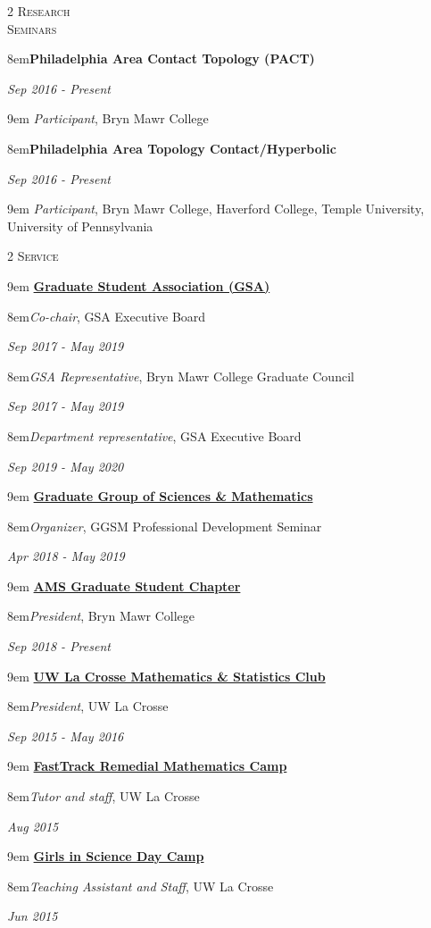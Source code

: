 \documentclass[11pt]{article}
\newcommand{\itemreg}[1]{\begin{addmargin}[0em]{9em} #1 \end{addmargin}}
\newcommand{\itemregind}[1]{\begin{addmargin}[1.75em]{9em} #1 \end{addmargin}}
\newcommand{\itemregdate}[2]{\begin{addmargin}[0em]{8em}#1\end{addmargin}\vspace{-1.5em}\hfill\textit{#2}\\ \vspace{.25em}}
\newcommand{\iteminddate}[2]{\begin{addmargin}[1.75em]{8em}#1\end{addmargin}\vspace{-1.5em}\hfill\textit{#2}\\ \vspace{.25em}}
\begin{document}
\begin{multicols}{2}
	\textsc{Research \\ Seminars}
	
	\columnbreak
	
	\itemregdate{\textbf{Philadelphia Area Contact Topology (PACT)}}{Sep 2016 - Present}
		\itemregind{\textit{Participant}, Bryn Mawr College}
	\itemregdate{\textbf{Philadelphia Area Topology Contact/Hyperbolic}}{Sep 2016 - Present}
		\itemregind{\textit{Participant}, Bryn Mawr College, Haverford College, Temple University, University of Pennsylvania}
	
\end{multicols}
\vspace{-.5em}



\begin{multicols}{2}
	\textsc{Service}
	
	\columnbreak
	
	\itemreg{\textbf{\href{https://www.brynmawr.edu/gsas/}{Graduate Student Association (GSA)}}}
		\iteminddate{\textit{Co-chair}, GSA Executive Board}{Sep 2017 - May 2019}
		\iteminddate{\textit{GSA Representative}, Bryn Mawr College Graduate Council}{Sep 2017 - May 2019}
		\iteminddate{\textit{Department representative}, GSA Executive Board}{Sep 2019 - May 2020}
		\vspace{.35em}
		
	\itemreg{\textbf{\href{https://www.brynmawr.edu/ggsm}{Graduate Group of Sciences \& Mathematics}}}
		\iteminddate{\textit{Organizer}, GGSM Professional Development Seminar}{Apr 2018 - May 2019}
		\vspace{.35em}
		
	\itemreg{\textbf{\href{http://www.ams.org/programs/studentchapters}{AMS Graduate Student Chapter}}}
		\iteminddate{\textit{President}, Bryn Mawr College}{Sep 2018 - Present}
		\vspace{.35em}
		
	\itemreg{\textbf{\href{https://www.uwlax.edu/mathematics/activities/mathematics-and-stats-club/}{UW La Crosse Mathematics \& Statistics Club}}}
		\iteminddate{\textit{President}, UW La Crosse}{Sep 2015 - May 2016}
		\vspace{.35em}
	
	\itemreg{\textbf{\href{https://www.uwlax.edu/mathematics/fasttrack/}{FastTrack Remedial Mathematics Camp}}}
		\iteminddate{\textit{Tutor and staff}, UW La Crosse}{Aug 2015}
		\vspace{.35em}
	
	\itemreg{\textbf{\href{https://www.uwlax.edu/conted/youth-programs/girls-in-science/welcome/}{Girls in Science Day Camp}}}
		\iteminddate{\textit{Teaching Assistant and Staff}, UW La Crosse}{Jun 2015}
\end{multicols}
\end{document}
